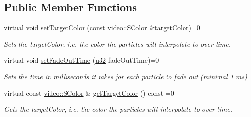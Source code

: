 \subsection*{Public Member Functions}
\begin{DoxyCompactItemize}
\item 
\mbox{\label{classirr_1_1scene_1_1IParticleFadeOutAffector_a600712e14e4a4a55da773cdc6f39cdf4}} 
virtual void \hyperlink{classirr_1_1scene_1_1IParticleFadeOutAffector_a600712e14e4a4a55da773cdc6f39cdf4}{set\+Target\+Color} (const \hyperlink{classirr_1_1video_1_1SColor}{video\+::\+S\+Color} \&target\+Color)=0
\begin{DoxyCompactList}\small\item\em Sets the target\+Color, i.\+e. the color the particles will interpolate to over time. \end{DoxyCompactList}\item 
\mbox{\label{classirr_1_1scene_1_1IParticleFadeOutAffector_a838758aef6c351a26c4d3190dc1b7645}} 
virtual void \hyperlink{classirr_1_1scene_1_1IParticleFadeOutAffector_a838758aef6c351a26c4d3190dc1b7645}{set\+Fade\+Out\+Time} (\hyperlink{namespaceirr_a0416a53257075833e7002efd0a18e804}{u32} fade\+Out\+Time)=0
\begin{DoxyCompactList}\small\item\em Sets the time in milliseconds it takes for each particle to fade out (minimal 1 ms) \end{DoxyCompactList}\item 
\mbox{\label{classirr_1_1scene_1_1IParticleFadeOutAffector_a85301f6c37546e881ffa354a67d673ed}} 
virtual const \hyperlink{classirr_1_1video_1_1SColor}{video\+::\+S\+Color} \& \hyperlink{classirr_1_1scene_1_1IParticleFadeOutAffector_a85301f6c37546e881ffa354a67d673ed}{get\+Target\+Color} () const =0
\begin{DoxyCompactList}\small\item\em Gets the target\+Color, i.\+e. the color the particles will interpolate to over time. \end{DoxyCompactList}\item 
\mbox{\label{classirr_1_1scene_1_1IParticleFadeOutAffector_a4c4195b7878fd93526506e1c592bdbec}} 

\end{DoxyCompactItemize}
